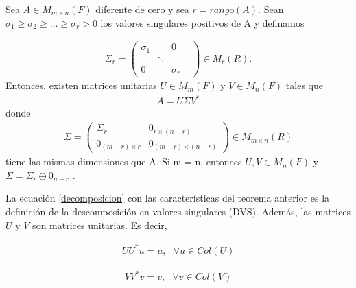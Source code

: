 \begin{theorem}
Sea $A \in M_{m \times n} (F)$ diferente de cero y sea $r =   rango(A)$. Sean $\sigma_1 \geq \sigma_2 \geq \dots \geq \sigma_r > 0$ los valores singulares positivos de A y definamos

\begin{equation*}
    \begin{aligned}
    \Sigma_r = 
    \begin{pmatrix}
    \sigma_1 & & 0 \\
     & \ddots & & \\
     0 & & \sigma_r
    \end{pmatrix}
    \in M_{r}(R).
    \end{aligned}
\end{equation*}
Entonces, existen matrices unitarias $U \in M_{m}(F)$ y $V \in M_{n}(F)$ tales que 
\begin{equation} \label{decomposicion}
    \begin{aligned}
    A = U \Sigma V^{*}
    \end{aligned}
\end{equation}
donde
\begin{equation*}
    \begin{aligned}
    \Sigma = 
    \begin{pmatrix}
    \Sigma_r & 0_{r \times (n-r)} \\
    0_{(m-r) \times r} & 0_{(m-r) \times (n-r)}
    \end{pmatrix}
    \in M_{m \times n}(R)
    \end{aligned}
\end{equation*}
 tiene las mismas dimensiones que A. Si m = n, entonces $U, V \in M_{n}(F)$ y $\Sigma = \Sigma_r \oplus 0_{n-r}$
 \cite[p.~421]{garcia2017second}.
\end{theorem}

La ecuación \ref{decomposicion} con las características del teorema anterior es la definición de la descomposición en valores singulares (DVS). Además, las matrices $U$ y $V$ son matrices unitarias. Es decir, 

\begin{equation*}
    \begin{aligned}
    U U^{*} u = u, \text{ } \forall u \in Col (U)
    \end{aligned}
\end{equation*}

\begin{equation*}
    \begin{aligned}
    V V^{*} v = v, \text{ } \forall v \in Col (V)
    \end{aligned}
\end{equation*}

